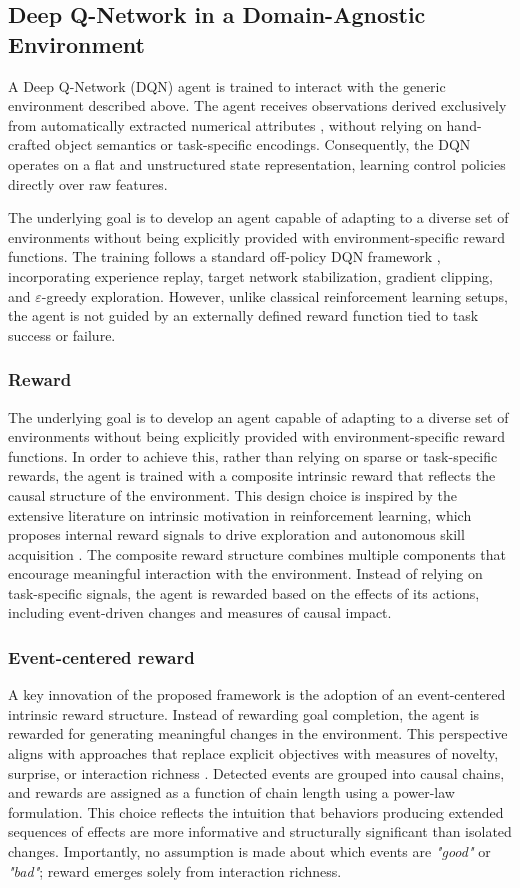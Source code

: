 \documentclass[12pt,a4paper]{report}
\begin{document}
\subsection{Deep Q-Network in a Domain-Agnostic Environment}
A Deep Q-Network (DQN) agent is trained to interact with the generic environment described above. The agent receives observations derived exclusively from automatically extracted numerical attributes \cite{chiave1}, without relying on hand-crafted object semantics or task-specific encodings. 
Consequently, the DQN operates on a flat and unstructured state representation, learning control policies directly over raw features.

The underlying goal is to develop an agent capable of adapting to a diverse set of environments without being explicitly provided with environment-specific reward functions.
The training follows a standard off-policy DQN framework \cite{chiave7}, incorporating experience replay, target network stabilization, gradient clipping, and $\varepsilon$-greedy exploration. However, unlike classical reinforcement learning setups, the agent is not guided by an externally defined reward function tied to task success or failure.

\subsubsection{Reward}
The underlying goal is to develop an agent capable of adapting to a diverse set of environments without being explicitly provided with environment-specific reward functions. In order to achieve this, rather than relying on sparse or task-specific rewards, the agent is trained with a composite intrinsic reward that reflects the causal structure of the environment.
This design choice is inspired by the extensive literature on intrinsic motivation in reinforcement learning, which proposes internal reward signals to drive exploration and autonomous skill acquisition \cite{chiave38}.
The composite reward structure combines multiple components that encourage meaningful interaction with the environment. Instead of relying on task-specific signals, the agent is rewarded based on the effects of its actions, including event-driven changes and measures of causal impact.

\subsubsection{Event-centered reward}
A key innovation of the proposed framework is the adoption of an event-centered intrinsic reward structure. Instead of rewarding goal completion, the agent is rewarded for generating meaningful changes in the environment. This perspective aligns with approaches that replace explicit objectives with measures of novelty, surprise, or interaction richness \cite{chiave39}.
Detected events are grouped into causal chains, and rewards are assigned as a function of chain length using a power-law formulation. This choice reflects the intuition that behaviors producing extended sequences of effects are more informative and structurally significant than isolated changes. Importantly, no assumption is made about which events are \textit{"good"} or \textit{"bad"}; reward emerges solely from interaction richness.
\end{document}
